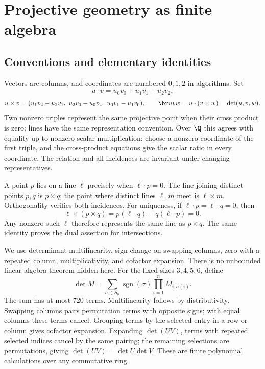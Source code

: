 \section{Projective geometry as finite algebra}\label{sec:geometry}

\subsection{Conventions and elementary identities}
Vectors are columns, and coordinates are numbered $0,1,2$ in algorithms.
Set
\[
 u\cdot v=u_0v_0+u_1v_1+u_2v_2,
\]
\[
 u\times v=(u_1v_2-u_2v_1,\ u_2v_0-u_0v_2,\ u_0v_1-u_1v_0),
 \qquad \br u v w=u\cdot(v\times w)=\det(u,v,w).
\]
Two nonzero triples represent the same projective point when their cross
product is zero; lines have the same representation convention. Over
$\Q$ this agrees with equality up to nonzero scalar multiplication:
choose a nonzero coordinate of the first triple, and the cross-product
equations give the scalar ratio in every coordinate. The relation and
all incidences are invariant under changing representatives.

A point $p$ lies on a line $\ell$ precisely when $\ell\cdot p=0$.
The line joining distinct points $p,q$ is $p\times q$; the point where
distinct lines $\ell,m$ meet is $\ell\times m$. Orthogonality verifies
both incidences. For uniqueness, if $\ell\cdot p=\ell\cdot q=0$, then
\[
 \ell\times(p\times q)=p(\ell\cdot q)-q(\ell\cdot p)=0.
\]
Any nonzero such $\ell$ therefore represents the same line as $p\times q$.
The same identity proves the dual assertion for intersections.

We use determinant multilinearity, sign change on swapping columns,
zero with a repeated column, multiplicativity, and cofactor expansion.
There is no unbounded linear-algebra theorem hidden here. For the fixed
sizes $3,4,5,6$, define
\begin{equation}\label{eq:detperm}
 \det M=\sum_{\sigma\in S_n}\operatorname{sgn}(\sigma)
                   \prod_{i=1}^n M_{i,\sigma(i)}.
\end{equation}
The sum has at most $720$ terms. Multilinearity follows by distributivity.
Swapping columns pairs permutation terms with opposite signs; with equal
columns these terms cancel. Grouping terms by the selected entry in a
row or column gives cofactor expansion. Expanding $\det(UV)$, terms with
repeated selected indices cancel by the same pairing; the remaining
selections are permutations, giving $\det(UV)=\det U\det V$.
These are finite polynomial calculations over any commutative ring.

